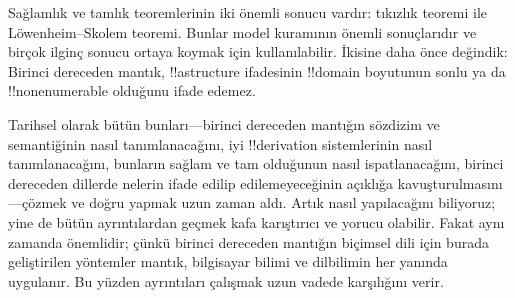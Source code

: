 Sağlamlık ve tamlık teoremlerinin iki önemli sonucu vardır: tıkızlık
teoremi ile Löwenheim--Skolem teoremi. Bunlar model kuramının önemli
sonuçlarıdır ve birçok ilginç sonucu ortaya koymak için kullanılabilir.
İkisine daha önce değindik: Birinci dereceden mantık, !!a{structure}
ifadesinin !!{domain} boyutunun sonlu ya da !!{nonenumerable} olduğunu
ifade edemez.

Tarihsel olarak bütün bunları---birinci dereceden mantığın sözdizim ve
semantiğinin nasıl tanımlanacağını, iyi !!{derivation} sistemlerinin
nasıl tanımlanacağını, bunların sağlam ve tam olduğunun nasıl
ispatlanacağını, birinci dereceden dillerde nelerin ifade edilip
edilemeyeceğinin açıklığa kavuşturulmasını---çözmek ve doğru yapmak uzun
zaman aldı. Artık nasıl yapılacağını biliyoruz; yine de bütün
ayrıntılardan geçmek kafa karıştırıcı ve yorucu olabilir. Fakat aynı
zamanda önemlidir; çünkü birinci dereceden mantığın biçimsel dili için
burada geliştirilen yöntemler mantık, bilgisayar bilimi ve dilbilimin
her yanında uygulanır. Bu yüzden ayrıntıları çalışmak uzun vadede
karşılığını verir.

